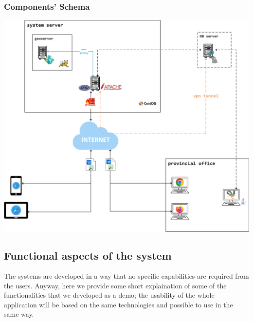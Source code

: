 \subsubsection{Components' Schema}
\includegraphics[width=\textwidth]{img/system}

\subsection{Functional aspects of the system}
The systems are developed in a way that no specific capabilities are required from the users.
Anyway, here we provide some short explaination of some of the functionalities that we developed as a demo; the usability of the whole application will be based on the same technologies and possible to use in the same way. 
